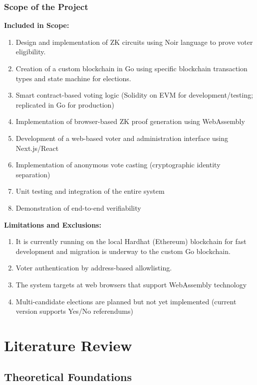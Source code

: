 \documentclass[12pt, a4paper]{report}
\begin{document}
\subsection{Scope of the Project}

\textbf{Included in Scope:}
\begin{enumerate}
    \item Design and implementation of ZK circuits using Noir language to prove voter eligibility.
    \item Creation of a custom blockchain in Go using specific blockchain transaction types and state machine for elections.
    \item Smart contract-based voting logic (Solidity on EVM for development/testing; replicated in Go for production)
    \item Implementation of browser-based ZK proof generation using WebAssembly
    \item Development of a web-based voter and administration interface using Next.js/React
    \item Implementation of anonymous vote casting (cryptographic identity separation)
    \item Unit testing and integration of the entire system
    \item Demonstration of end-to-end verifiability
\end{enumerate}

\textbf{Limitations and Exclusions:}
\begin{enumerate}
    \item It is currently running on the local Hardhat (Ethereum) blockchain for fast development and migration is underway to the custom Go blockchain.
    \item Voter authentication by address-based allowlisting.
    \item The system targets at web browsers that support WebAssembly technology
    \item Multi-candidate elections are planned but not yet implemented (current version supports Yes/No referendums)
\end{enumerate}


\chapter{Literature Review}

\section{Theoretical Foundations}
\end{document}

